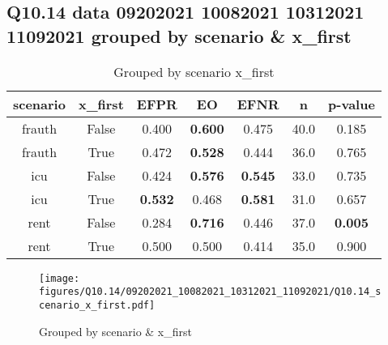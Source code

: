 \subsection{Q10.14 data 09202021 10082021 10312021 11092021 grouped by scenario \& x_first}

\begin{comment}
                     EFPR        EO      EFNR     n    pvalue
(frauth, False)  0.400000  0.600000  0.475000  40.0  0.184979
(frauth, True)   0.472222  0.527778  0.444444  36.0  0.764806
(icu, False)     0.424242  0.575758  0.545455  33.0  0.735384
(icu, True)      0.532258  0.467742  0.580645  31.0  0.657359
(rent, False)    0.283784  0.716216  0.445946  37.0  0.004610
(rent, True)     0.500000  0.500000  0.414286  35.0  0.899741
\end{comment}

\begin{table}[h]
    \centering
    \begin{tabular}{|c|c|c|c|c|c|c|}
        \hline
        scenario & x_first & EFPR & EO & EFNR & n & p-value\\
        \hline
        frauth & False & 0.400 & \textbf{0.600} & 0.475 & 40.0 & 0.185\\
		frauth & True & 0.472 & \textbf{0.528} & 0.444 & 36.0 & 0.765\\
		icu & False & 0.424 & \textbf{0.576} & \textbf{0.545} & 33.0 & 0.735\\
		icu & True & \textbf{0.532} & 0.468 & \textbf{0.581} & 31.0 & 0.657\\
		rent & False & 0.284 & \textbf{0.716} & 0.446 & 37.0 & \textbf{0.005}\\
		rent & True & 0.500 & 0.500 & 0.414 & 35.0 & 0.900\\
		
        \hline
    \end{tabular}
    \caption{Grouped by scenario x_first}
    \label{tab:my_label}
\end{table}
\begin{figure}[h]
    \centering
    \texttt{[image: figures/Q10.14/09202021\_10082021\_10312021\_11092021/Q10.14\_scenario\_x\_first.pdf]}
    \caption{Grouped by scenario \& x_first}
    \label{fig:my_label}
\end{figure}
